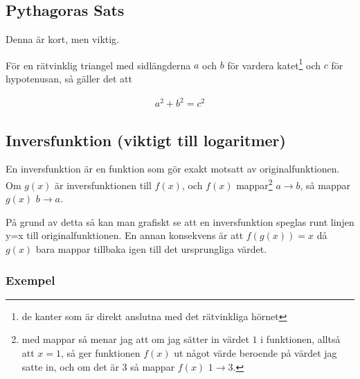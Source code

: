 \newpage
\subsection{Pythagoras Sats}
\label{Pythagoras Sats}

Denna är kort, men viktig. 

\begin{theorem}
	För en rätvinklig triangel med sidlängderna $a$ och $b$ för vardera katet\footnote{de kanter som är direkt anslutna med det rätvinkliga hörnet} och $c$ för hypotenusan, så gäller det att 

	\begin{align}
		a^2+b^2=c^2
	\end{align}
\end{theorem}

\newpage
\subsection{Inversfunktion (viktigt till logaritmer)}
\label{Inversfunktion}

En inversfunktion är en funktion som gör exakt motsatt av originalfunktionen. Om $g(x)$ är inversfunktionen till $f(x)$, och $f(x)$ mappar\footnote{med mappar så menar jag att om jag sätter in värdet $1$ i funktionen, alltså att $x=1$, så ger funktionen $f(x)$ ut något värde beroende på värdet jag satte in, och om det är $3$ så mappar $f(x)$ $1 \rightarrow 3$.} $a \rightarrow b$, så mappar $g(x)$ $b \rightarrow a$.

På grund av detta så kan man grafiskt se att en inversfunktion speglas runt linjen y=x till originalfunktionen. En annan konsekvens är att $f(g(x))=x$ då $g(x)$ bara mappar tillbaka igen till det ursprungliga värdet.

\subsubsection{Exempel}

